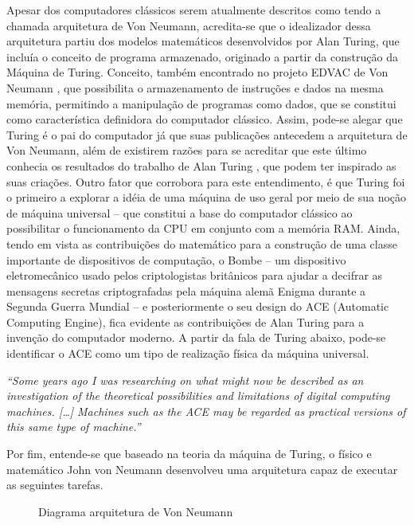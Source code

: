 Apesar dos computadores clássicos serem atualmente descritos como tendo a chamada arquitetura de Von Neumann, acredita-se que o idealizador dessa arquitetura partiu dos modelos matemáticos desenvolvidos por Alan Turing, que incluía o conceito de programa armazenado, originado a partir da construção da Máquina de Turing. Conceito, também encontrado no projeto EDVAC de Von Neumann \cite{9}, que possibilita o armazenamento de instruções e dados na mesma memória, permitindo a manipulação de programas como dados, que se constitui como característica definidora do computador clássico. Assim, pode-se alegar que Turing é o pai do computador já que suas publicações antecedem a arquitetura de Von Neumann, além de existirem razões para se acreditar que este último conhecia os resultados do trabalho de Alan Turing \cite{10}, que podem ter inspirado as suas criações. Outro fator que corrobora para este entendimento, é que Turing foi o primeiro a explorar a idéia de uma máquina de uso geral por meio de sua noção de máquina universal – que constitui a base do computador clássico ao possibilitar o funcionamento da CPU em conjunto com a memória RAM. Ainda, tendo em vista as contribuições do matemático para a construção de uma classe importante de dispositivos de computação, o Bombe – um dispositivo eletromecânico usado pelos criptologistas britânicos para ajudar a decifrar as mensagens secretas criptografadas pela máquina alemã Enigma durante a Segunda Guerra Mundial – e posteriormente o seu design do ACE (Automatic Computing Engine), fica evidente as contribuições de Alan Turing para a invenção do computador moderno. A partir da fala de Turing abaixo, pode-se identificar o ACE como um tipo de realização física da máquina universal.

\textit{
  ``Some years ago I was researching on what might now be described as an investigation of the theoretical possibilities and limitations of digital computing machines. […] Machines such as the ACE may be regarded as practical versions of this same type of machine.'' \cite{11}
}

Por fim, entende-se que baseado na teoria da máquina de Turing, o físico e matemático John von Neumann desenvolveu uma arquitetura capaz de executar as seguintes tarefas.

\vspace{1cm}
\begin{figure}[H] \centering 
  \caption{\label{fig:3} Diagrama arquitetura de Von Neumann} 
\end{figure}

